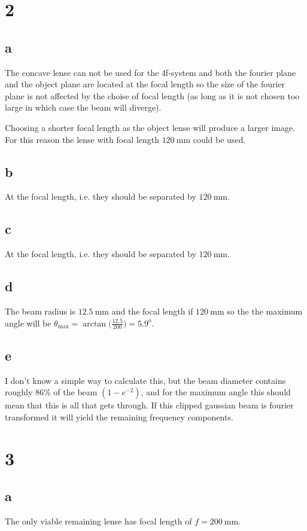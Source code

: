 \documentclass[12pt,a4paper]{article}
\begin{document}
\section{2}\label{sec:2}
\subsection{a}\label{sec:2a}
The concave lense can not be used for the 4f-system and both the fourier plane and the object plane are located at the focal length so the size of the fourier plane is not affected by the choise of focal length (as long as it is not chosen too large in which case the beam will diverge).

Choosing a shorter focal length as the object lense will produce a larger image. For this reason the lense with focal length $\SI{120}{\milli\metre}$ could be used.
\subsection{b}\label{sec:2b}
At the focal length, i.e. they should be separated by $\SI{120}{\milli\metre}$.
\subsection{c}\label{sec:2c}
At the focal length, i.e. they should be separated by $\SI{120}{\milli\metre}$.
\subsection{d}\label{sec:2d}
The beam radius is $\SI{12.5}{\milli\metre}$ and the focal length if $\SI{120}{\milli\metre}$ so the the maximum angle will be $\theta_{\text{max}}=\arctan\big(\frac{12.5}{200}\big)=5.9^{\text{o}}$.
\subsection{e}\label{sec:2e}
I don't know a simple way to calculate this, but the beam diameter contains roughly $86\%$ of the beam $(1-e^{-2})$, and for the maximum angle this should mean that this is all that gets through. If this clipped gaussian beam is fourier transformed it will yield the remaining frequency components.

\section{3}\label{sec:3}
\subsection{a}\label{sec:3a}
The only viable remaining lense has focal length of $f=\SI{200}{\milli\metre}$.
\end{document}
